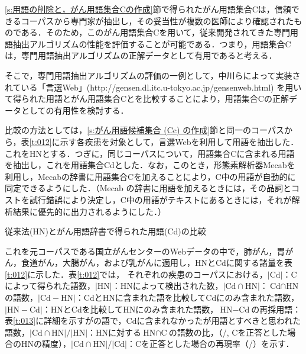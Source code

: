 \documentclass[japanese]{jnlp_1.4}
\def\maru#1{}
\begin{document}
\ref{s:用語の削除と，がん用語集合Cの作成}節で得られたがん用語集合Cは，信頼できるコーパスから専門家が抽出し，その妥当性が複数の医師により確認されたものである．そのため，このがん用語集合Cを用いて，従来開発されてきた専門用語抽出アルゴリズムの性能を評価することが可能である．つまり，用語集合Cは，専門用語抽出アルゴリズムの正解データとして有用であると考える．

そこで，専門用語抽出アルゴリズムの評価の一例として，中川らによって実装されている「言選Web」(http://gensen.dl.itc.u-tokyo.ac.jp/gensenweb.html) を用いて得られた用語とがん用語集合Cとを比較することにより，用語集合Cの正解データとしての有用性を検討する．

比較の方法としては，\ref{s:がん用語候補集合 (Cc) の作成}節と同一のコーパスから，表\ref{t:012}に示す各疾患を対象として，言選Webを利用して用語を抽出した．これをHNとする．つぎに，同じコーパスについて，用語集合Cに含まれる用語を抽出し，これを用語集合Cdとした．なお，このとき，形態素解析器Mecabを利用し，Mecabの辞書に用語集合Cを加えることにより，C中の用語が自動的に同定できるようにした．（Mecab の辞書に用語を加えるときには，その品詞とコストを試行錯誤により決定し，C中の用語がテキストにあるときには，それが解析結果に優先的に出力されるようにした．）

\begin{table}[b]
\vspace{-5pt}
 \caption{従来法(HN)とがん用語辞書で得られた用語(Cd)の比較}
 \begin{center}

 \end{center}
 \label{t:012}
\end{table}

これを元コーパスである国立がんセンターのWebデータの中で，肺がん，胃がん，食道がん，大腸がん，および乳がんに適用し，HNとCdに関する諸量を表\ref{t:012}に示した．表\ref{t:012}では，
それぞれの疾患のコーパスにおける，\maru{1}$|\text{Cd}|$：Cによって得られた語数，\maru{2}$|\text{HN}|$：HNによって検出された数，\maru{3}$|\text{Cd}\cap\text{HN}|$：$\text{Cd}\cap\text{HN}$の語数，\maru{4}$|\text{Cd}-\text{HN}|$：CdとHNに含まれた語を比較してCdにのみ含まれた語数，\maru{5}$|\text{HN}-\text{Cd}|$：HNとCdを比較してHNにのみ含まれた語数，\maru{6}$\text{HN}-\text{Cd}$の再採用語：表\ref{t:013}に詳細を示すが\maru{5}の語で，Cdに含まれなかったが用語とすべきと思われた語数，\maru{7}$|\text{Cd}\cap\text{HN}|/|\text{HN}|$：HNに対する$\text{HN}\cap\text{C}$の語数の比，（\maru{3}/\maru{2}, Cを正答とした場合のHNの精度），\maru{8}$|\text{Cd}\cap\text{HN}|/|\text{Cd}|$：Cを正答とした場合の再現率（\maru{3}/\maru{1}）を示す．
\end{document}
